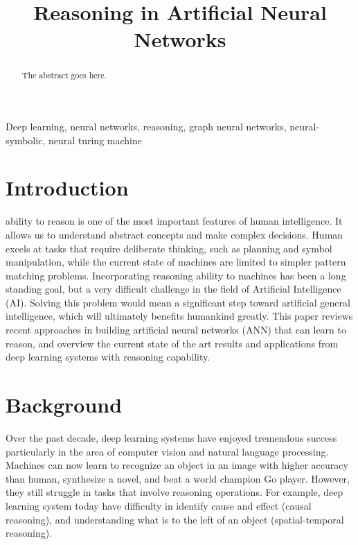 \documentclass[journal]{IEEEtran}
\begin{document}
\title{Reasoning in Artificial Neural Networks}

\author{%
}

\maketitle


\begin{abstract}
The abstract goes here.
\end{abstract}


\begin{IEEEkeywords}
Deep learning, neural networks, reasoning, graph neural networks, neural-symbolic, neural turing machine
\end{IEEEkeywords}



\section{Introduction}

 ability to reason is one of the most important features of human intelligence. 
It allows us to understand abstract concepts and make complex decisions.
Human excels at tasks that require deliberate thinking, such as planning and symbol manipulation, 
while the current state of machines are limited to simpler pattern matching problems.
Incorporating reasoning ability to machines has been a long standing goal, but a very difficult challenge in the field of Artificial Intelligence (AI). 
Solving this problem would mean a significant step toward artificial general intelligence, which will ultimately benefits humankind greatly. 
This paper reviews recent approaches in building artificial neural networks (ANN) that can learn to reason, 
and overview the current state of the art results and applications from deep learning systems with reasoning capability.

\section{Background}
Over the past decade, deep learning systems have enjoyed tremendous success particularly in the area of computer vision and natural language processing.
Machines can now learn to recognize an object in an image with higher accuracy than human, synthesize a novel, and beat a world champion Go player.
However, they still struggle in tasks that involve reasoning operations. For example, deep learning system today have difficulty in
identify cause and effect (causal reasoning), and understanding what is to the left of an object (spatial-temporal reasoning).
\end{document}
